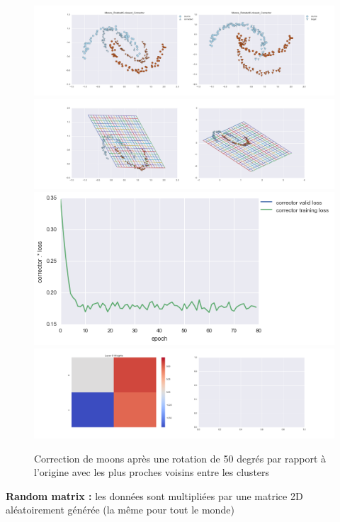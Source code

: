 \begin{figure}[H] %
\centering
\includegraphics[width=\linewidth]{fig/24-05-2016/moons/Moons_RotatedK-closest_Corrector-DATA.png}
\includegraphics[width=\linewidth]{fig/24-05-2016/moons/Moons_RotatedK-closest_Corrector-GridCheck.png}
\includegraphics[width=0.45\linewidth]{fig/24-05-2016/moons/Moons_RotatedK-closest_Corrector-Learning_curve.png}
\includegraphics[width=\linewidth]{fig/24-05-2016/moons/Moons_RotatedK-closest_Corrector-W.png}
\caption{Correction de moons après une rotation de 50 degrés par rapport à l'origine avec les plus proches voisins entre les clusters}
\label{fig:recap-moons-rot-exhaustive}
\end{figure}

{\Large \textbf{Random matrix :}} les données sont multipliées par une matrice 2D aléatoirement générée
 (la même pour tout le monde)

